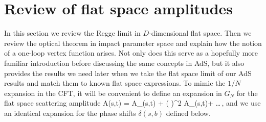 
\section{Review of flat space amplitudes}
\label{sec:flat_space}



In this section we review the Regge limit in $D$-dimensional flat space. Then we review 
the optical theorem in impact parameter space and explain how the notion of a one-loop vertex function arises. 
Not only does this serve as a hopefully more familiar introduction before discussing the same concepts in AdS, but it also provides the results we need later when we take the flat space limit of our AdS results and match them to known flat space expressions. To mimic the $1/N$ expansion in the CFT, it will be convenient to define an expansion in $G_N$ for the flat space scattering amplitude
\beq
A(s,t) =
A_{}(s,t) +
 \left( \right)^2 
A_{}(s,t)+ \dots \,,
\label{eq:amplitude_loop_expansion}
\eeq
and we use an identical expansion for the phase shifts $\delta(s,b)$ defined below.
